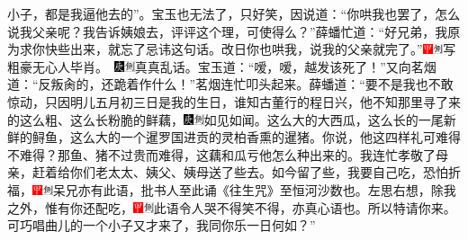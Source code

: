 小子，都是我逼他去的”。宝玉也无法了，只好笑，因说道：“你哄我也罢了，怎么说我父亲呢？我告诉姨娘去，评评这个理，可使得么？”薛蟠忙道：“好兄弟，我原为求你快些出来，就忘了忌讳这句话。改日你也哄我，说我的父亲就完了。”{\includegraphics[width=3mm]{../Images/00002}\includegraphics[width=3mm]{../Images/00011}\footnotesize \kaishu 写粗豪无心人毕肖。　\includegraphics[width=3mm]{../Images/00004}\includegraphics[width=3mm]{../Images/00011}\footnotesize \kaishu 真真乱话。}宝玉道：“嗳，嗳，越发该死了！”又向茗烟道：“反叛肏的，还跪着作什么！”茗烟连忙叩头起来。薛蟠道：“要不是我也不敢惊动，只因明儿五月初三日是我的生日，谁知古董行的程日兴，他不知那里寻了来的这么粗、这么长粉脆的鲜藕，{\includegraphics[width=3mm]{../Images/00004}\includegraphics[width=3mm]{../Images/00011}\footnotesize \kaishu 如见如闻。}这么大的大西瓜，这么长的一尾新鲜的鲟鱼，这么大的一个暹罗国进贡的灵柏香熏的暹猪。你说，他这四样礼可难得不难得？那鱼、猪不过贵而难得，这藕和瓜亏他怎么种出来的。我连忙孝敬了母亲，赶着给你们老太太、姨父、姨母送了些去。如今留了些，我要自己吃，恐怕折福，{\includegraphics[width=3mm]{../Images/00002}\includegraphics[width=3mm]{../Images/00011}\footnotesize \kaishu 呆兄亦有此语，批书人至此诵《往生咒》至恒河沙数也。}左思右想，除我之外，惟有你还配吃，{\includegraphics[width=3mm]{../Images/00002}\includegraphics[width=3mm]{../Images/00011}\footnotesize \kaishu 此语令人哭不得笑不得，亦真心语也。}所以特请你来。可巧唱曲儿的一个小子又才来了，我同你乐一日何如？”

